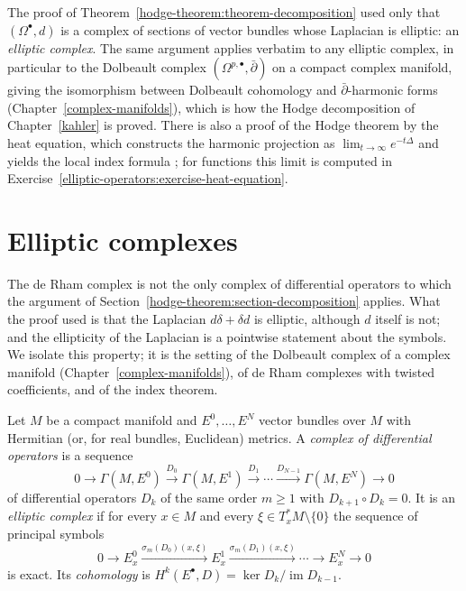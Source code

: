 \begin{remark}\label{hodge-theorem:remark-elliptic-complexes}
The proof of Theorem~\ref{hodge-theorem:theorem-decomposition} used only that $(\Omega^\bullet, d)$ is a complex of sections of vector bundles whose Laplacian is elliptic: an \emph{elliptic complex}. The same
argument applies verbatim to any elliptic complex, in particular to the Dolbeault complex $(\Omega^{p,\bullet}, \bar\partial)$ on a compact complex manifold, giving the isomorphism between Dolbeault
cohomology and $\bar\partial$-harmonic forms (Chapter~\ref{complex-manifolds}), which is how the Hodge decomposition of Chapter~\ref{kahler} is proved. There is also a proof of the Hodge theorem by the
heat equation, which constructs the harmonic projection as $\lim_{t \to \infty}e^{-t\Delta}$ and yields the local index formula \cite{lawson-michelsohn}; for functions this limit is computed in
Exercise~\ref{elliptic-operators:exercise-heat-equation}.
\end{remark}

\section{Elliptic complexes}\label{hodge-theorem:section-elliptic-complexes}

The de Rham complex is not the only complex of differential operators to which the argument of Section~\ref{hodge-theorem:section-decomposition} applies. What the proof used is that the Laplacian
$d\delta + \delta d$ is elliptic, although $d$ itself is not; and the ellipticity of the Laplacian is a pointwise statement about the symbols. We isolate this property; it is the setting of the Dolbeault
complex of a complex manifold (Chapter~\ref{complex-manifolds}), of de Rham complexes with twisted coefficients, and of the index theorem.

\begin{definition}\label{hodge-theorem:definition-elliptic-complex}
Let $M$ be a compact manifold and $E^0, \ldots, E^N$ vector bundles over $M$ with Hermitian (or, for real bundles, Euclidean) metrics. A \emph{complex of differential operators} is a sequence
\[
0 \to \Gamma(M, E^0) \xrightarrow{D_0} \Gamma(M, E^1) \xrightarrow{D_1} \cdots \xrightarrow{D_{N-1}} \Gamma(M, E^N) \to 0
\]
of differential operators $D_k$ of the same order $m \geq 1$ with $D_{k+1} \circ D_k = 0$. It is an \emph{elliptic complex} if for every $x \in M$ and every $\xi \in T^*_xM \setminus \{0\}$ the sequence of principal symbols
\[
0 \to E^0_x \xrightarrow{\sigma_m(D_0)(x, \xi)} E^1_x \xrightarrow{\sigma_m(D_1)(x, \xi)} \cdots \to E^N_x \to 0
\]
is exact. Its \emph{cohomology} is $H^k(E^\bullet, D) = \ker D_k/\operatorname{im}D_{k-1}$.
\end{definition}

